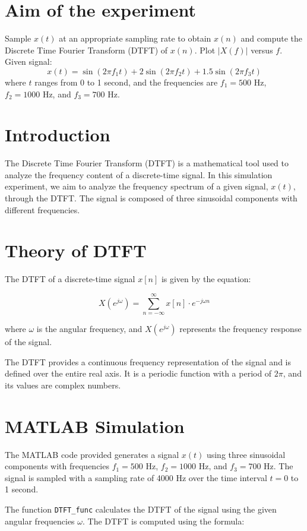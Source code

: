 \documentclass[journal,12pt,onecolumn]{IEEEtran}
\theoremstyle{remark}
\begin{document}
\section{Aim of the experiment}
Sample \(x(t)\) at an appropriate sampling rate to obtain \(x(n)\) and compute the Discrete Time Fourier Transform (DTFT) of \(x(n)\). Plot \(|X(f)|\) versus \(f\).
Given signal:
\[ x(t) = \sin(2\pi f_1 t) + 2\sin(2\pi f_2 t) + 1.5\sin(2\pi f_3 t) \]
where \(t\) ranges from 0 to 1 second, and the frequencies are \(f_1 = 500\) Hz, \(f_2 = 1000\) Hz, and \(f_3 = 700\) Hz.
\section{Introduction}

The Discrete Time Fourier Transform (DTFT) is a mathematical tool used to analyze the frequency content of a discrete-time signal. In this simulation experiment, we aim to analyze the frequency spectrum of a given signal, \(x(t)\), through the DTFT. The signal is composed of three sinusoidal components with different frequencies.

\section{Theory of DTFT}

The DTFT of a discrete-time signal \(x[n]\) is given by the equation:

\[ X(e^{j\omega}) = \sum_{n=-\infty}^{\infty} x[n] \cdot e^{-j\omega n} \]

where \(\omega\) is the angular frequency, and \(X(e^{j\omega})\) represents the frequency response of the signal.

The DTFT provides a continuous frequency representation of the signal and is defined over the entire real axis. It is a periodic function with a period of \(2\pi\), and its values are complex numbers.

\section{MATLAB Simulation}

The MATLAB code provided generates a signal \(x(t)\) using three sinusoidal components with frequencies \(f_1 = 500\) Hz, \(f_2 = 1000\) Hz, and \(f_3 = 700\) Hz. The signal is sampled with a sampling rate of 4000 Hz over the time interval \(t = 0\) to 1 second.

The function \texttt{DTFT\_func} calculates the DTFT of the signal using the given angular frequencies \(\omega\). The DTFT is computed using the formula:
\end{document}
